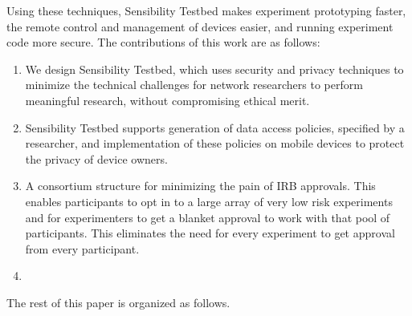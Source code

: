 Using these techniques, Sensibility Testbed makes experiment
prototyping faster, the remote control and management of devices
easier, and running experiment code more secure. The
contributions of this work are as follows:

\begin{enumerate}
\item We design Sensibility Testbed, which uses security and 
privacy techniques to minimize the technical challenges for 
network researchers to perform meaningful research, without 
compromising ethical merit.

\item Sensibility Testbed supports generation of data access 
policies, specified by a researcher, and implementation of 
these policies on mobile devices to protect the privacy of 
device owners.

\item A consortium structure for minimizing the pain of IRB 
approvals.  This enables participants to opt in to a large 
array of very low risk experiments and for experimenters to 
get a blanket approval to work with that pool of participants.  
This eliminates the need for every experiment to get approval 
from every participant.

\item {}
\end{enumerate}

The rest of this paper is organized as follows. 